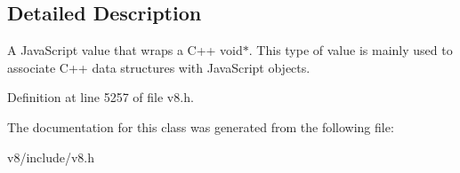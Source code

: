 \subsection{Detailed Description}
A Java\+Script value that wraps a C++ void$\ast$. This type of value is mainly used to associate C++ data structures with Java\+Script objects. 

Definition at line 5257 of file v8.\+h.



The documentation for this class was generated from the following file\+:\begin{DoxyCompactItemize}
\item 
v8/include/v8.\+h\end{DoxyCompactItemize}
